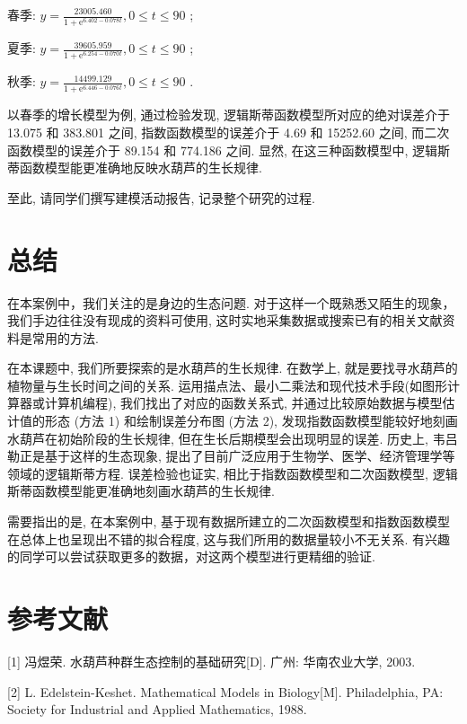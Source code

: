 \documentclass[10pt]{article}
\begin{document}
春季: \(y = \frac{23005.460}{1 + {\mathrm{e}}^{{6.402} - {0.078t}}},0 \leq  t \leq  {90}\) ;

夏季: \(y = \frac{39605.959}{1 + {\mathrm{e}}^{{6.254} - {0.070t}}},0 \leq  t \leq  {90}\) ;

秋季: \(y = \frac{14499.129}{1 + {\mathrm{e}}^{{6.446} - {0.076t}}},0 \leq  t \leq  {90}\) .

以春季的增长模型为例, 通过检验发现, 逻辑斯蒂函数模型所对应的绝对误差介于 13.075 和 383.801 之间, 指数函数模型的误差介于 4.69 和 15252.60 之间, 而二次函数模型的误差介于 89.154 和 774.186 之间. 显然, 在这三种函数模型中, 逻辑斯蒂函数模型能更准确地反映水葫芦的生长规律.

至此, 请同学们撰写建模活动报告, 记录整个研究的过程.

\section*{总结}

在本案例中，我们关注的是身边的生态问题. 对于这样一个既熟悉又陌生的现象，我们手边往往没有现成的资料可使用, 这时实地采集数据或搜索已有的相关文献资料是常用的方法.

在本课题中, 我们所要探索的是水葫芦的生长规律. 在数学上, 就是要找寻水葫芦的植物量与生长时间之间的关系. 运用描点法、最小二乘法和现代技术手段(如图形计算器或计算机编程), 我们找出了对应的函数关系式, 并通过比较原始数据与模型估计值的形态 (方法 1) 和绘制误差分布图 (方法 2), 发现指数函数模型能较好地刻画水葫芦在初始阶段的生长规律, 但在生长后期模型会出现明显的误差. 历史上, 韦吕勒正是基于这样的生态现象, 提出了目前广泛应用于生物学、医学、经济管理学等领域的逻辑斯蒂方程. 误差检验也证实, 相比于指数函数模型和二次函数模型, 逻辑斯蒂函数模型能更准确地刻画水葫芦的生长规律.

需要指出的是, 在本案例中, 基于现有数据所建立的二次函数模型和指数函数模型在总体上也呈现出不错的拟合程度, 这与我们所用的数据量较小不无关系. 有兴趣的同学可以尝试获取更多的数据，对这两个模型进行更精细的验证.

\section*{参考文献}

[1] 冯煜荣. 水葫芦种群生态控制的基础研究[D]. 广州: 华南农业大学, 2003.

[2] L. Edelstein-Keshet. Mathematical Models in Biology[M]. Philadelphia, PA: Society for Industrial and Applied Mathematics, 1988.
\end{document}
